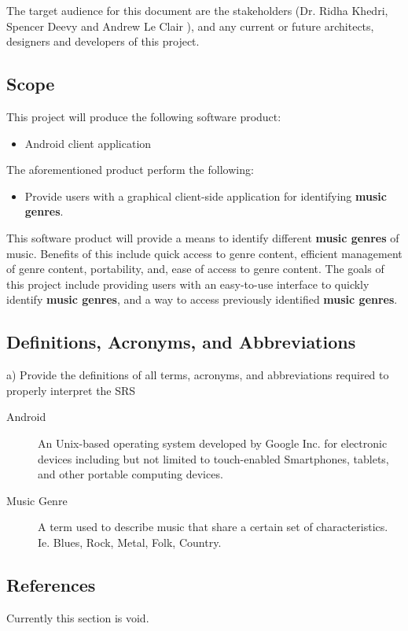 \documentclass[]{article}
\begin{document}
The target audience for this document are the stakeholders (Dr. Ridha Khedri, Spencer Deevy and Andrew Le Clair ), and any current or future architects, designers and developers of this project.


\subsection{Scope}
\label{sub:scope}
This project will produce the following software product:
\begin{itemize}
  \item Android client application
\end{itemize}

\noindent The aforementioned product perform the following:
\begin{itemize}
  \item Provide users with a graphical client-side application for identifying \textbf{music genres}.
\end{itemize}

This software product will provide a means to identify different \textbf{music genres} of music. Benefits of this include quick access to genre content, efficient management of genre content, portability, and, ease of access to genre content.  The goals of this project include providing users with an easy-to-use interface to quickly identify \textbf{music genres}, and a way to access previously identified \textbf{music genres}.  


\subsection{Definitions, Acronyms, and Abbreviations}
\label{sub:definitions_acronyms_and_abbreviations}
a) Provide the definitions of all terms, acronyms, and abbreviations required to properly interpret the SRS
\begin{description}
 \item [Android] An Unix-based operating system developed by Google Inc. for
    electronic devices including but not limited to touch-enabled
    Smartphones, tablets, and other portable computing devices.
 \item [Music Genre] A term used to describe music that share a certain set of characteristics. Ie. Blues, Rock, Metal, Folk, Country.



\end{description}


\subsection{References}
\label{sub:references}
Currently this section is void.
\end{document}

